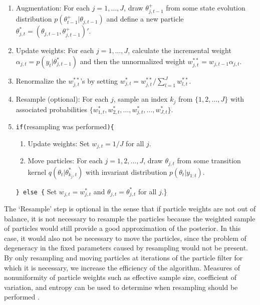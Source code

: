 \documentclass{article}
\begin{document}
\begin{enumerate}
\item Augmentation: For each $j = 1,\ldots,J$, draw $\theta^{+}_{j,t-1}$ from some state evolution distribution $p(\theta^{+}_{t-1}|\theta_{j,t-1})$ and define a new particle $\theta^{*}_{j,t} = (\theta_{j,t-1},\theta^{+}_{j,t-1})'$.
\item Update weights: For each $j = 1,\ldots,J$, calculate the incremental weight $\alpha_{j,t} = p(y_t|\theta^{*}_{j,t-1})$ and then the  unnormalized weight $w^{**}_{j,t} = w_{j,t-1}\alpha_{j,t}$.
\item Renormalize the $w^{**}_{j,t}$'s by setting $w^{*}_{j,t} = w^{**}_{j,t} / \sum_{l=1}^J w^{**}_{l,t}$.
\item Resample (optional): For each $j$, sample an index $k_j$ from $\{1,2,\ldots,J\}$ with associated probabilities $\{w^{*}_{1,t},w^{*}_{2,t},\ldots,w^{*}_{j,t},\ldots,w^{*}_{J,t}\}$.
\item {\tt if(}resampling was performed{\tt )\{} \\
\begin{enumerate}[label=\alph*.]
\item Update weights: Set $w_{j,t} = 1 / J$ for all $j$.
\item Move particles: For each $j = 1,2,\ldots,J$, draw $\theta_{j,t}$ from some transition kernel $q(\theta_t|\theta^{*}_{k_j,t})$ with invariant distribution $p(\theta_t|y_{1:t})$.
\end{enumerate}
{\tt \} else \{} Set $w_{j,t} = w^{*}_{j,t}$ and $\theta_{j,t} = \theta^{*}_{j,t}$ for all $j$.\}
\end{enumerate}

The `Resample' step is optional in the sense that if particle weights are not out of balance, it is not necessary to resample the particles because the weighted sample of particles would still provide a good approximation of the posterior. In this case, it would also not be necessary to move the particles, since the problem of degeneracy in the fixed parameters caused by resampling would not be present. By only resampling and moving particles at iterations of the particle filter for which it is necessary, we increase the efficiency of the algorithm. Measures of nonuniformity of particle weights such as effective sample size, coefficient of variation, and entropy can be used to determine when resampling should be performed \citep{Liu:Chen:Wong:reje:1998}. %
\end{document}
